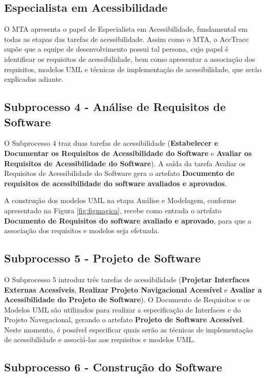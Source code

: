 \documentclass[runningheads,a4paper]{llncs}
\begin{document}
\subsection{Especialista em Acessibilidade}

O MTA apresenta o papel de Especialista em Acessibilidade, fundamental em todas
as etapas das tarefas de acessibilidade. Assim como o MTA, o AccTrace supõe que
a equipe de desenvolvimento possui tal persona, cujo papel é identificar os
requisitos de acessibilidade, bem como apresentar a associação dos requisitos,
modelos UML e técnicas de implementação de acessibilidade, que serão explicadas
adiante.

\subsection{Subprocesso 4 - Análise de Requisitos de Software}

O Subprocesso 4 traz duas tarefas de acessibilidade (\textbf{Estabelecer e
Documentar os Requisitos de Acessibilidade do Software} e \textbf{Avaliar os
Requisitos de Acessibilidade do Software}). A saída da tarefa {Avaliar os
Requisitos de Acessibilidade do Software} gera o artefato \textbf{Documento de
requisitos de acessibilidade do software avaliados e aprovados}.

A construção dos modelos UML na etapa Análise e Modelagem, conforme apresentado
na Figura \ref{fig:figmagica}, recebe como entrada o artefato \textbf{Documento
de Requisitos do software avaliado e aprovado}, para que a associação dos
requisitos e modelos seja efetuada.

\subsection{Subprocesso 5 - Projeto de Software}

O Subprocesso 5 introduz três tarefas de acessibilidade (\textbf{Projetar
Interfaces Externas Acessíveis}, \textbf{Realizar Projeto Navigacional
Acessível} e \textbf{Avaliar a Acessibilidade do Projeto de Software}). O
Documento de Requisitos e os Modelos UML são utilizados para realizar a
especificação de Interfaces e do Projeto Navegacional, gerando o artefato
\textbf{Projeto de Software Acessível}. Neste momento, é possível especificar
quais serão as técnicas de implementação de acessibilidade e associá-las aos
requisitos e modelos UML.

\subsection{Subprocesso 6 - Construção do Software}
\end{document}
